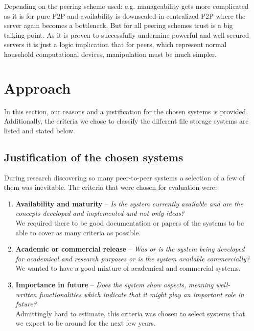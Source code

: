 Depending on the peering scheme used: e.g. manageability gets more complicated as it is for pure P2P and availability is downscaled in centralized P2P where the server again becomes a bottleneck. But for all peering schemes trust is a big talking point. As it is proven to successfully undermine powerful and well secured servers it is just a logic implication that for peers, which represent normal household computational devices, manipulation must be much simpler.

\section{Approach} %
\label{sec:approach}
In this section, our reasons and a justification for the chosen systems is provided. Additionally, the criteria we chose to classify the different file storage systems are listed and stated below.

\subsection{Justification of the chosen systems}
During research discovering so many peer-to-peer systems a selection of a few of them was inevitable. The criteria that were chosen for evaluation were:
\begin{enumerate}
\item \textbf{Availability and maturity} -- \textit{Is the system currently available and are the concepts developed and implemented and not only ideas?}\\
We required there to be good documentation or papers of the systems to be able to cover as many criteria as possible.

\item \textbf{Academic or commercial release} -- \textit{Was or is the system being developed for academical and research purposes or is the system available commercially?}\\
We wanted to have a good mixture of academical and commercial systems.

\item \textbf{Importance in future} -- \textit{Does the system show aspects, meaning well-written functionalities which indicate that it might play an important role in future?}\\
Admittingly hard to estimate, this criteria was chosen to select systems that we expect to be around for the next few years.
\end{enumerate}


